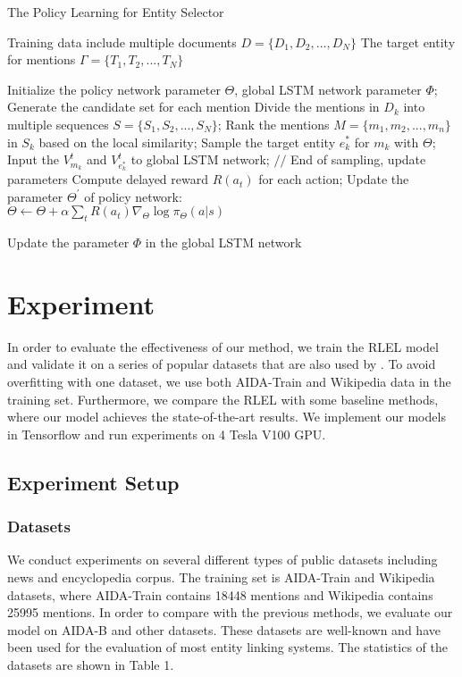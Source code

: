\documentclass[sigconf]{acmart}
\begin{document}
\begin{algorithm}[t]
\caption{The Policy Learning for Entity Selector}
\begin{algorithmic}[1]
\REQUIRE Training data include multiple documents $D = \{D_1, D_2, ..., D_N\}$
\ENSURE The target entity for mentions $\Gamma = \{T_1, T_2, ..., T_N\}$ 

\STATE Initialize the policy network parameter $\Theta$, global LSTM network parameter $\Phi$;
\STATE Generate the candidate set for each mention
\STATE Divide the mentions in $D_k$ into multiple sequences $S = \{S_1, S_2, ..., S_N\}$;
\STATE Rank the mentions $M = \{m_1, m_2, ..., m_n\}$ in $S_k$ based on the local similarity;
\STATE Sample the target entity $e_{k}^*$ for $m_k$ with $\Theta$;
\STATE Input the $V_{m_k}^t$ and ${V_{e_k^*}^t}$ to global LSTM network;
\ENDFOR
\STATE $//$ End of sampling, update parameters 
\STATE Compute delayed reward $R(a_t)$ for each action;
\STATE Update the parameter ${\Theta}^{'}$ of policy network:\\
\qquad $\Theta \leftarrow \Theta + \alpha \sum_{t}R(a_t)\nabla_{\Theta}\log\pi_{\Theta}(a|s)$

\ENDFOR
\STATE Update the parameter $\Phi$ in the global LSTM network\\
\ENDFOR
\end{algorithmic}
\end{algorithm}

\section{Experiment}
In order to evaluate the effectiveness of our method, we train the RLEL model and validate it on a series of popular datasets that are also used by \cite{GaneaH17, TitovL18a}. To avoid overfitting with one dataset, we use both  AIDA-Train and Wikipedia data in the training set. Furthermore, we compare the RLEL with some baseline methods, where our model achieves the state-of-the-art results. We implement our models in Tensorflow and run experiments on 4 Tesla V100 GPU. 



\subsection{Experiment Setup}
\subsubsection*{Datasets}
We conduct experiments on several different types of public datasets including news and encyclopedia corpus. The training set is AIDA-Train and Wikipedia datasets, where AIDA-Train contains 18448 mentions and Wikipedia contains 25995 mentions. In order to compare with the previous methods, we evaluate our model on AIDA-B and other datasets. These datasets are well-known and have been used for the evaluation of most entity linking systems. The statistics of the datasets are shown in Table 1.
\end{document}
